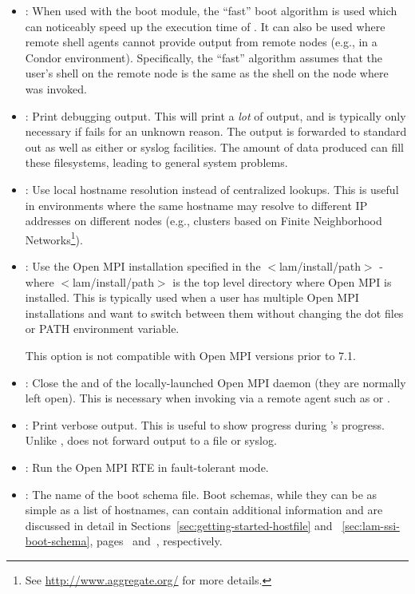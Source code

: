 \begin{itemize}
\item {}: When used with the  boot module, the
  ``fast'' boot algorithm is used which can noticeably speed up the
  execution time of .  It can also be used where remote
  shell agents cannot provide output from remote nodes (e.g., in a
  Condor environment).  Specifically, the ``fast'' algorithm assumes
  that the user's shell on the remote node is the same as the shell on
  the node where  was invoked.
  
\item {}: Print debugging output.  This will print a {\em
    lot} of output, and is typically only necessary if 
  fails for an unknown reason.  The output is forwarded to standard
  out as well as either  or syslog facilities.  The amount of
  data produced can fill these filesystems, leading to general system
  problems.

\item {}: Use local hostname resolution instead of
  centralized lookups.  This is useful in environments where the same
  hostname may resolve to different IP addresses on different nodes
  (e.g., clusters based on Finite Neighborhood Networks\footnote{See
    \url{http://www.aggregate.org/} for more details.}).
  

\item {}: Use the Open MPI
  installation specified in the $<$lam/install/path$>$ - where
  $<$lam/install/path$>$ is the top level directory where Open MPI is
  installed. This is typically used when a user has multiple Open MPI
  installations and want to switch between them without changing the
  dot files or PATH environment variable.
  
  This option is not compatible with Open MPI versions prior to 7.1.


\item {}: Close the  and  of the
  locally-launched Open MPI daemon (they are normally left open).  This is
  necessary when invoking  via a remote agent such as
   or .
  
\item {}: Print verbose output.  This is useful to show
  progress during 's progress.  Unlike ,
   does not forward output to a file or syslog.

\item {}: Run the Open MPI RTE in fault-tolerant mode.
  
\item {}: The name of the boot schema file.  Boot
  schemas, while they can be as simple as a list of hostnames, can
  contain additional information and are discussed in detail
  in Sections~\ref{sec:getting-started-hostfile} and
  ~\ref{sec:lam-ssi-boot-schema},
  pages~\pageref{sec:getting-started-hostfile}
  and~\pageref{sec:lam-ssi-boot-schema}, respectively.
\end{itemize}

